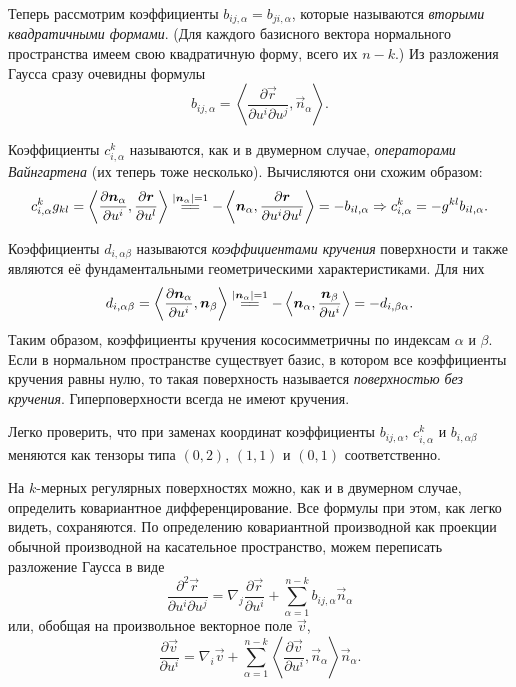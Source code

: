 Теперь рассмотрим коэффициенты $b_{ij, \alpha} = b_{ji, \alpha}$, которые называются \textit{вторыми квадратичными формами}. (Для каждого базисного вектора нормального пространства имеем свою квадратичную форму, всего их $n - k$.) Из разложения Гаусса сразу очевидны формулы
\[
	b_{ij, \alpha} = \left\langle\frac{\partial\vec{r}}{\partial u^i \partial u^j}, \vec{n}_{\alpha}\right\rangle.
\]

Коэффициенты $c_{i, \alpha}^k$ называются, как и в двумерном случае, \textit{операторами Вайнгартена} (их теперь тоже несколько). Вычисляются они схожим образом:
\[
	c_{i, \alpha}^kg_{kl} = \left\langle\frac{\partial\vec{n}_\alpha}{\partial u^i}, \frac{\partial\vec{r}}{\partial u^l}\right\rangle \stackrel{\abs{\vec{n}_\alpha} = 1}{=\joinrel=} -\left\langle\vec{n}_\alpha, \frac{\partial\vec{r}}{\partial u^i \partial u^l}\right\rangle = -b_{il, \alpha} \Rightarrow c_{i, \alpha}^k = -g^{kl}b_{il, \alpha}.
\]

Коэффициенты $d_{i, \alpha\beta}$ называются \textit{коэффициентами кручения} поверхности и также являются её фундаментальными геометрическими характеристиками. Для них
\[
	d_{i, \alpha\beta} = \left\langle\frac{\partial\vec{n}_\alpha}{\partial u^i}, \vec{n}_\beta\right\rangle \stackrel{\abs{\vec{n}_\alpha} = 1}{=\joinrel=} -\left\langle \vec{n}_\alpha, \frac{\vec{n}_\beta}{\partial u^i}\right\rangle = -d_{i, \beta\alpha}.
\]
Таким образом, коэффициенты кручения кососимметричны по индексам $\alpha$ и $\beta$. Если в нормальном пространстве существует базис, в котором все коэффициенты кручения равны нулю, то такая поверхность называется \textit{поверхностью без кручения}. Гиперповерхности всегда не имеют кручения.

Легко проверить, что при заменах координат коэффициенты $b_{ij, \alpha}$, $c_{i, \alpha}^k$ и $b_{i, \alpha\beta}$ меняются как тензоры типа $(0, 2)$, $(1, 1)$ и $(0, 1)$ соответственно.

На $k$-мерных регулярных поверхностях можно, как и в двумерном случае, определить ковариантное дифференцирование. Все формулы при этом, как легко видеть, сохраняются. По определению ковариантной производной как проекции обычной производной на касательное пространство, можем переписать разложение Гаусса в виде
\[
	\frac{\partial^2\vec{r}}{\partial u^i\partial u^j} = \nabla_j\frac{\partial\vec{r}}{\partial u^i} + \sum_{\alpha = 1}^{n - k}b_{ij, \alpha}\vec{n}_\alpha
\]
или, обобщая на произвольное векторное поле $\vec{v}$,
\begin{equation} \label{eq:Covariantkdim}
	\frac{\partial\vec{v}}{\partial u^i} = \nabla_i\vec{v} + \sum_{\alpha = 1}^{n - k}\left\langle\frac{\partial\vec{v}}{\partial u^i}, \vec{n}_\alpha\right\rangle\vec{n}_\alpha.
\end{equation}

